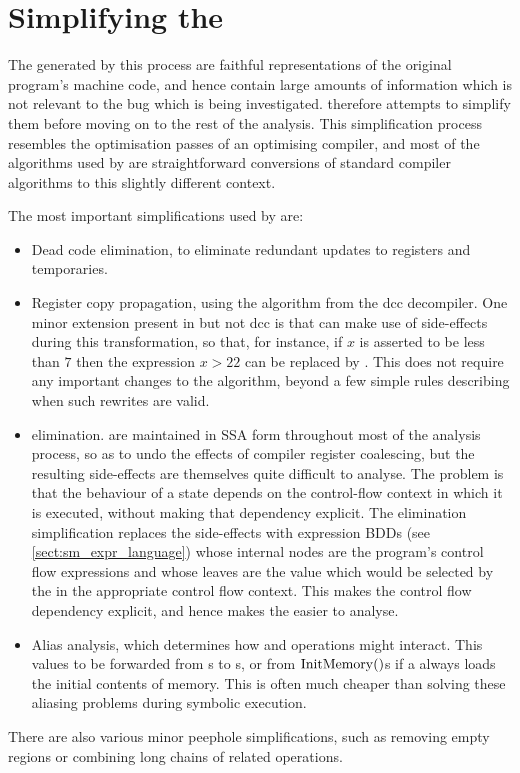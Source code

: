 \section{Simplifying the {\StateMachine}}
\label{sect:derive:simplify_sm}

The {\StateMachines} generated by this process are faithful
representations of the original program's machine code, and hence
contain large amounts of information which is not relevant to the bug
which is being investigated.  {\Technique} therefore attempts to
simplify them before moving on to the rest of the analysis.  This
simplification process resembles the optimisation passes of an
optimising compiler, and most of the algorithms used by {\technique}
are straightforward conversions of standard compiler algorithms to
this slightly different context.

The most important simplifications used by {\technique} are:

\begin{itemize}
\item Dead code elimination, to eliminate redundant updates to
  registers and {\StateMachine} temporaries.
\item Register copy propagation, using the algorithm from the
  dcc\cite{Cifuentes1994} decompiler.  One minor extension present in
  {\technique} but not dcc is that {\technique} can make use of
   side-effects during this transformation, so that, for
  instance, if $x$ is asserted to be less than $7$ then the expression
  $x > 22$ can be replaced by \false.  This does not require any
  important changes to the algorithm, beyond a few simple rules
  describing when such rewrites are valid.
\item \state{$\Phi$} elimination.  {\STateMachines} are maintained in
  SSA form throughout most of the analysis process, so as to undo the
  effects of compiler register coalescing, but the resulting
  \state{$\Phi$} side-effects are themselves quite difficult to
  analyse.  The problem is that the behaviour of a \state{$\Phi$}
  state depends on the control-flow context in which it is executed,
  without making that dependency explicit.  The \state{$\Phi$}
  elimination simplification replaces the \state{$\Phi$} side-effects
  with expression BDDs (see \autoref{sect:sm_expr_language}) whose
  internal nodes are the program's control flow expressions and whose
  leaves are the value which would be selected by the \state{$\Phi$}
  in the appropriate control flow context.  This makes the control
  flow dependency explicit, and hence makes the {\StateMachine} easier
  to analyse.
\item Alias analysis, which determines how  and
   operations might interact.  This values to be forwarded
  from s to s, or from $\mathrm{InitMemory}()$s if a
   always loads the initial contents of memory.  This is
  often much cheaper than solving these aliasing problems during
  symbolic execution.
\end{itemize}
There are also various minor peephole simplifications, such as
removing empty  regions or combining long chains of
related  operations.

